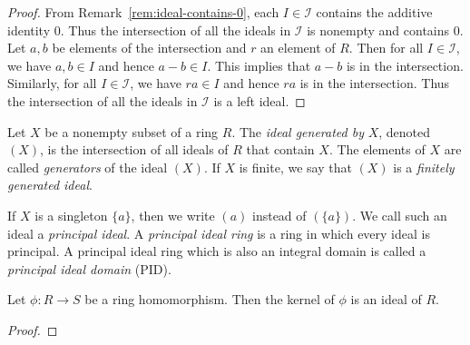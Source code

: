 \begin{proof}
    From Remark~\ref{rem:ideal-contains-0}, each \(I \in \mathcal{I}\) contains the additive identity \(0\). Thus the intersection of all the ideals in \(\mathcal{I}\) is nonempty and contains \(0\). Let \(a, b\) be elements of the intersection and \(r\) an element of \(R\). Then for all \(I \in \mathcal{I}\), we have \(a, b \in I\) and hence \(a - b \in I\). This implies that \(a - b\) is in the intersection. Similarly, for all \(I \in \mathcal{I}\), we have \(ra \in I\) and hence \(ra\) is in the intersection. Thus the intersection of all the ideals in \(\mathcal{I}\) is a left ideal.
\end{proof}

\begin{definition}
    Let \(X\) be a nonempty subset of a ring \(R\). The \emph{ideal generated by} \(X\), denoted \((X)\), is the intersection of all ideals of \(R\) that contain \(X\). The elements of \(X\) are called \emph{generators} of the ideal \((X)\). If \(X\) is finite, we say that \((X)\) is a \emph{finitely generated ideal}.

    If \(X\) is a singleton \(\{a\}\), then we write \((a)\) instead of \((\{a\})\). We call such an ideal a \emph{principal ideal}. A \emph{principal ideal ring} is a ring in which every ideal is principal. A principal ideal ring which is also an integral domain is called a \emph{principal ideal domain} (PID).
\end{definition}

\begin{theorem}
    Let \(\phi: R \to S\) be a ring homomorphism. Then the kernel of \(\phi\) is an ideal of \(R\).
\end{theorem}

\begin{proof}
    
\end{proof}